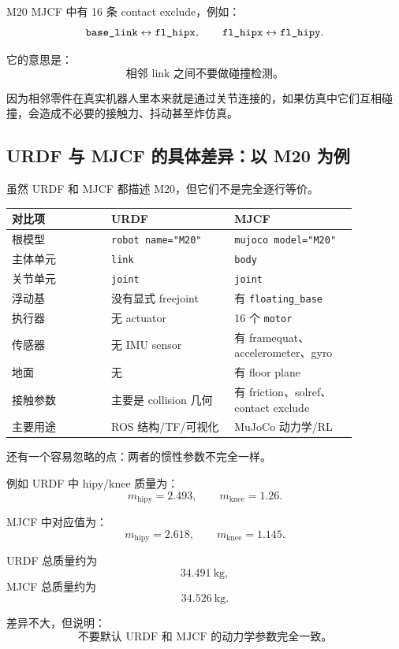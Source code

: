 \documentclass[UTF8,11pt,a4paper]{ctexart}
\begin{document}
M20 MJCF 中有 16 条 contact exclude，例如：
\[
\text{\texttt{base\_link}} \leftrightarrow \text{\texttt{fl\_hipx}},
\qquad
\text{\texttt{fl\_hipx}} \leftrightarrow \text{\texttt{fl\_hipy}}.
\]

它的意思是：
\[
\text{相邻 link 之间不要做碰撞检测。}
\]

因为相邻零件在真实机器人里本来就是通过关节连接的，如果仿真中它们互相碰撞，会造成不必要的接触力、抖动甚至炸仿真。

\subsection{URDF 与 MJCF 的具体差异：以 M20 为例}

虽然 URDF 和 MJCF 都描述 M20，但它们不是完全逐行等价。

\begin{center}
\begin{tabular}{p{0.25\linewidth}p{0.31\linewidth}p{0.31\linewidth}}
\toprule
对比项 & URDF & MJCF \\
\midrule
根模型 & \texttt{robot name="M20"} & \texttt{mujoco model="M20"}\\
主体单元 & \texttt{link} & \texttt{body}\\
关节单元 & \texttt{joint} & \texttt{joint}\\
浮动基 & 没有显式 freejoint & 有 \texttt{floating\_base}\\
执行器 & 无 actuator & 16 个 \texttt{motor}\\
传感器 & 无 IMU sensor & 有 framequat、accelerometer、gyro\\
地面 & 无 & 有 floor plane\\
接触参数 & 主要是 collision 几何 & 有 friction、solref、contact exclude\\
主要用途 & ROS 结构/TF/可视化 & MuJoCo 动力学/RL\\
\bottomrule
\end{tabular}
\end{center}

还有一个容易忽略的点：两者的惯性参数不完全一样。

例如 URDF 中 hipy/knee 质量为：
\[
m_{\text{hipy}}=2.493,\qquad
m_{\text{knee}}=1.26.
\]

MJCF 中对应值为：
\[
m_{\text{hipy}}=2.618,\qquad
m_{\text{knee}}=1.145.
\]

URDF 总质量约为
\[
34.491\ \mathrm{kg},
\]
MJCF 总质量约为
\[
34.526\ \mathrm{kg}.
\]

差异不大，但说明：
\[
\boxed{
\text{不要默认 URDF 和 MJCF 的动力学参数完全一致。}
}
\]
\end{document}
